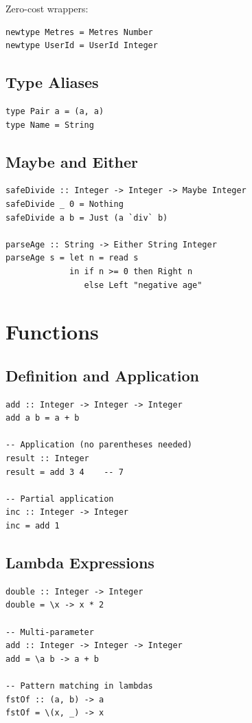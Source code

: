 \documentclass[11pt,a4paper]{article}
\begin{document}
Zero-cost wrappers:

\begin{lstlisting}
newtype Metres = Metres Number
newtype UserId = UserId Integer
\end{lstlisting}

\subsection{Type Aliases}

\begin{lstlisting}
type Pair a = (a, a)
type Name = String
\end{lstlisting}

\subsection{Maybe and Either}

\begin{lstlisting}
safeDivide :: Integer -> Integer -> Maybe Integer
safeDivide _ 0 = Nothing
safeDivide a b = Just (a `div` b)

parseAge :: String -> Either String Integer
parseAge s = let n = read s
             in if n >= 0 then Right n
                else Left "negative age"
\end{lstlisting}

\section{Functions}

\subsection{Definition and Application}

\begin{lstlisting}
add :: Integer -> Integer -> Integer
add a b = a + b

-- Application (no parentheses needed)
result :: Integer
result = add 3 4    -- 7

-- Partial application
inc :: Integer -> Integer
inc = add 1
\end{lstlisting}

\subsection{Lambda Expressions}

\begin{lstlisting}
double :: Integer -> Integer
double = \x -> x * 2

-- Multi-parameter
add :: Integer -> Integer -> Integer
add = \a b -> a + b

-- Pattern matching in lambdas
fstOf :: (a, b) -> a
fstOf = \(x, _) -> x
\end{lstlisting}
\end{document}
